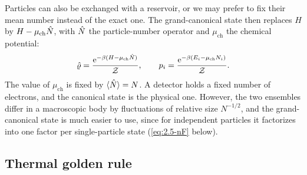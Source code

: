 Particles can also be exchanged with a reservoir, or we may prefer to fix their mean number instead of the exact one. The grand-canonical state then replaces $H$ by $H - \mu_{\mathrm{ch}}\hat{N}$, with $\hat{N}$ the particle-number operator and $\mu_{\mathrm{ch}}$ the chemical potential:
\begin{equation}
  \hat{\varrho} = \frac{\mathrm{e}^{-\beta(H - \mu_{\mathrm{ch}}\hat{N})}}{\mathcal{Z}}, \qquad p_i = \frac{\mathrm{e}^{-\beta(E_i - \mu_{\mathrm{ch}}N_i)}}{\mathcal{Z}} .
  \label{eq:2.5-grand}
\end{equation}
The value of $\mu_{\mathrm{ch}}$ is fixed by $\langle\hat{N}\rangle = N$. A detector holds a fixed number of electrons, and the canonical state is the physical one. However, the two ensembles differ in a macroscopic body by fluctuations of relative size $N^{-1/2}$, and the grand-canonical state is much easier to use, since for independent particles it factorizes into one factor per single-particle state (\cref{eq:2.5-nF} below).

\subsection{Thermal golden rule}

